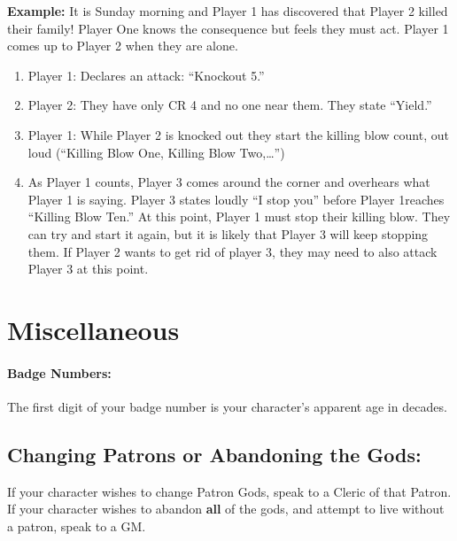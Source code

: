 \documentclass[sheet]{GL2020}
\begin{document}
\textbf{Example:}\newline
It is Sunday morning and Player 1 has discovered that Player 2 killed their family! Player One knows the consequence but feels they must act. Player 1 comes up to Player 2 when they are alone. 
\begin{enumerate}
	\item Player 1: Declares an attack: ``Knockout 5.'' 
	\item Player 2: They have only CR 4 and no one near them. They state ``Yield.''
	\item Player 1: While Player 2 is knocked out they start the killing blow count, out loud (``Killing Blow One, Killing Blow Two,\ldots'')
	\item As Player 1 counts, Player 3 comes around the corner and overhears what Player 1 is saying. Player 3 states loudly ``I stop you'' before Player 1reaches ``Killing Blow Ten.'' At this point, Player 1 must stop their killing blow. They can try and start it again, but it is likely that Player 3 will keep stopping them. If Player 2 wants to get rid of player 3, they may need to also attack Player 3 at this point.
\end{enumerate}

\section{Miscellaneous}

\paragraph{Badge Numbers:} The first digit of your badge number is your character's apparent age in decades.

\subsection{Changing Patrons or Abandoning the Gods:}
If your character wishes to change Patron Gods, speak to a Cleric of that Patron. If your character wishes to abandon \textbf{all} of the gods, and attempt to live without a patron, speak to a GM.
\end{document}
